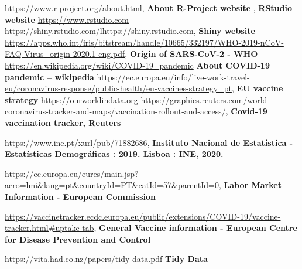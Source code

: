 \documentclass[11pt,a4paper]{report}
\begin{document}

\begin{thebibliography}{10}

 \url{https://www.r-project.org/about.html}, \textbf{About R-Project website}
, \textbf{ RStudio website} \url{https://www.rstudio.com}
\url{https://shiny.rstudio.com/l}{https://shiny.rstudio.com}, \textbf{Shiny website}
\url{https://apps.who.int/iris/bitstream/handle/10665/332197/WHO-2019-nCoV-FAQ-Virus_origin-2020.1-eng.pdf},\textbf{ Origin of SARS-CoV-2 - \ac{WHO}}
 \url{https://en.wikipedia.org/wiki/COVID-19_pandemic} \textbf{About COVID-19 pandemic -- wikipedia}
\url{https://ec.europa.eu/info/live-work-travel-eu/coronavirus-response/public-health/eu-vaccines-strategy_pt}, \textbf{EU vaccine strategy} 
\url{https://ourworldindata.org}
\url{https://graphics.reuters.com/world-coronavirus-tracker-and-maps/vaccination-rollout-and-access/}, \textbf{Covid-19 vaccination tracker, Reuters} 


\url{https://www.ine.pt/xurl/pub/71882686}, \textbf{Instituto Nacional de Estatística - Estatísticas Demográficas : 2019. Lisboa : INE, 2020.} 


\url{https://ec.europa.eu/eures/main.jsp?acro=lmi&lang=pt&countryId=PT&catId=57&parentId=0}, \textbf{Labor Market Information - European Commission} 

\url{https://vaccinetracker.ecdc.europa.eu/public/extensions/COVID-19/vaccine-tracker.html#uptake-tab}, \textbf{General Vaccine information - European Centre for Disease Prevention and Control } 

\url{https://vita.had.co.nz/papers/tidy-data.pdf}  \textbf{Tidy Data} 
\end{thebibliography}
\end{document}
